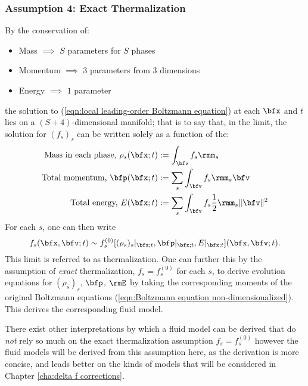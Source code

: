 \subsubsection*{Assumption 4: Exact Thermalization}
    By the conservation of:
    \begin{itemize}
        \item  Mass $\implies$ $S$ parameters for $S$ phases
        \item  Momentum $\implies$ $3$ parameters from $3$ dimensions
        \item  Energy $\implies$ $1$ parameter
    \end{itemize}
    the solution to (\ref{eqn:local leading-order Boltzmann equation}) at each $\bfx$ and $t$ lies on a $(S + 4)$-dimensional manifold; that is to say that, in the limit, the solution for $(f_{s})_{s}$ can be written solely as a function of the:
    \begin{align}
        \text{Mass in each phase, }  \rho_{s}(\bfx; t)  &:=  \int_{\bfv}f_{s}\rmm_{s}  \\
        \text{Total momentum, }          \bfp(\bfx; t)  &:=  \sum_{s}\int_{\bfv}f_{s}\rmm_{s}\bfv  \\
        \text{Total energy, }               E(\bfx; t)  &:=  \sum_{s}\int_{\bfv}f_{s}\frac{1}{2}\rmm_{s}\|\bfv\|^{2}
    \end{align}
    For each $s$, one can then write
    \begin{equation}
        f_{s}(\bfx, \bfv; t)  \sim  f_{s}^{(0)}[(\rho_{s})_{s}|_{\bfx; t}, \bfp|_{\bfx; t}, E|_{\bfx; t}](\bfx, \bfv; t).
    \end{equation}
    This limit is referred to as thermalization. One can further this by the assumption of \emph{exact} thermalization, $f_{s}  =  f_{s}^{(0)}$ for each $s$, to derive evolution equations for $(\rho_{s})_{s}$, $\bfp$, $\rmE$ by taking the corresponding moments of the original Boltzmann equations (\ref{eqn:Boltzmann equation non-dimensionalized}). This derives the corresponding fluid model.

    \begin{remark}
        There exist other interpretations by which a fluid model can be derived that do \emph{not} rely so much on the exact thermalization assumption $f_{s}  =  f_{s}^{(0)}$  however the fluid models will be derived from this assumption here, as the derivation is more concise, and leads better on the kinds of models that will be considered in Chapter \ref{cha:delta f corrections}. 
    \end{remark}

